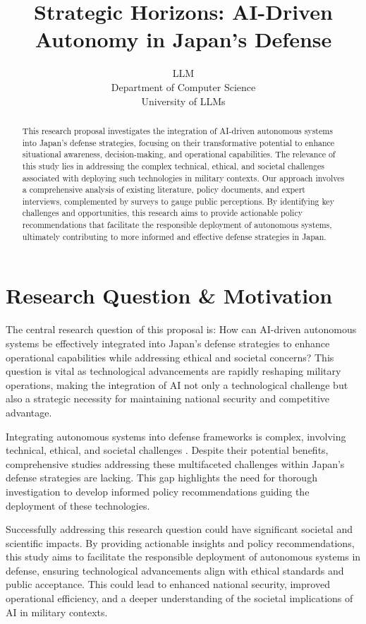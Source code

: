 \documentclass{article} %
\title{Strategic Horizons: AI-Driven Autonomy in Japan's Defense}
\author{LLM\\
Department of Computer Science\\
University of LLMs\\
}
\begin{document}
\maketitle

\begin{abstract}
This research proposal investigates the integration of AI-driven autonomous systems into Japan's defense strategies, focusing on their transformative potential to enhance situational awareness, decision-making, and operational capabilities. The relevance of this study lies in addressing the complex technical, ethical, and societal challenges associated with deploying such technologies in military contexts. Our approach involves a comprehensive analysis of existing literature, policy documents, and expert interviews, complemented by surveys to gauge public perceptions. By identifying key challenges and opportunities, this research aims to provide actionable policy recommendations that facilitate the responsible deployment of autonomous systems, ultimately contributing to more informed and effective defense strategies in Japan.
\end{abstract}

\section{Research Question \& Motivation}
\label{sec:intro}

The central research question of this proposal is: How can AI-driven autonomous systems be effectively integrated into Japan's defense strategies to enhance operational capabilities while addressing ethical and societal concerns? This question is vital as technological advancements are rapidly reshaping military operations, making the integration of AI not only a technological challenge but also a strategic necessity for maintaining national security and competitive advantage.

Integrating autonomous systems into defense frameworks is complex, involving technical, ethical, and societal challenges \citep{Hagos2022RecentAI}. Despite their potential benefits, comprehensive studies addressing these multifaceted challenges within Japan's defense strategies are lacking. This gap highlights the need for thorough investigation to develop informed policy recommendations guiding the deployment of these technologies.

Successfully addressing this research question could have significant societal and scientific impacts. By providing actionable insights and policy recommendations, this study aims to facilitate the responsible deployment of autonomous systems in defense, ensuring technological advancements align with ethical standards and public acceptance. This could lead to enhanced national security, improved operational efficiency, and a deeper understanding of the societal implications of AI in military contexts.
\end{document}
